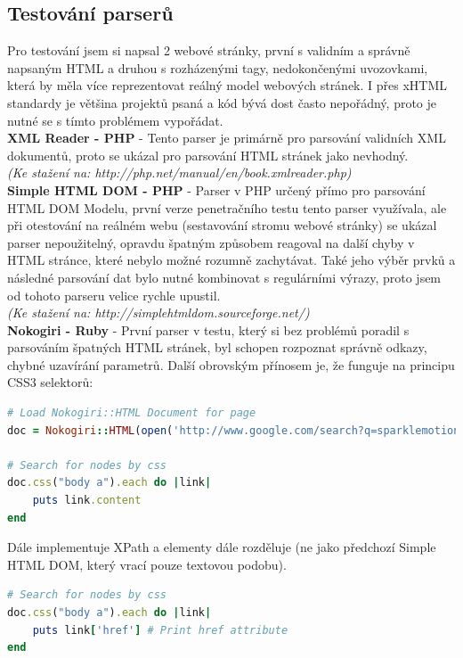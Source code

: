 \documentclass[12pt, a4paper]{report}
\begin{document}
\subsection{Testování parserů}
Pro testování jsem si napsal 2 webové stránky, první s validním a správně napsaným HTML a druhou s rozházenými tagy, nedokončenými uvozovkami, která by měla více reprezentovat reálný model webových stránek. I přes xHTML standardy je většina projektů psaná  a kód bývá dost často nepořádný, proto je nutné se s tímto problémem vypořádat.\\
\newline
\textbf{XML Reader - PHP} - Tento parser je primárně pro parsování validních XML dokumentů, proto se ukázal pro parsování HTML stránek jako nevhodný.\\
\textit{(Ke stažení na: http://php.net/manual/en/book.xmlreader.php)}\\
\newline
\textbf{Simple HTML DOM - PHP} - Parser v PHP určený přímo pro parsování HTML DOM Modelu, první verze penetračního testu tento parser využívala, ale při otestování na reálném webu (sestavování stromu webové stránky) se ukázal parser nepoužitelný, opravdu špatným způsobem reagoval na další chyby v HTML stránce, které nebylo možné rozumně zachytávat. Také jeho výběr prvků a následné parsování dat bylo nutné kombinovat s regulárními výrazy, proto jsem od tohoto parseru velice rychle upustil.\\
\textit{(Ke stažení na: http://simplehtmldom.sourceforge.net/)}\\
\newline
\textbf{Nokogiri - Ruby} - První parser v testu, který si bez problémů poradil s parsováním špatných HTML stránek, byl schopen rozpoznat správně odkazy, chybné uzavírání parametrů. Další obrovským přínosem je, že funguje na principu CSS3 selektorů:
\begin{lstlisting}[label=some-code,language=Ruby, caption=CSS3 Selektory NokoGiri]
# Load Nokogiri::HTML Document for page
doc = Nokogiri::HTML(open('http://www.google.com/search?q=sparklemotion'))

# Search for nodes by css
doc.css("body a").each do |link|
	puts link.content
end
\end{lstlisting}
Dále implementuje XPath a elementy dále rozděluje (ne jako předchozí Simple HTML DOM, který vrací pouze textovou podobu).
\begin{lstlisting}[label=some-code,language=Ruby, caption=Parsování]
# Search for nodes by css
doc.css("body a").each do |link|
	puts link['href'] # Print href attribute
end
\end{lstlisting}
\end{document}
